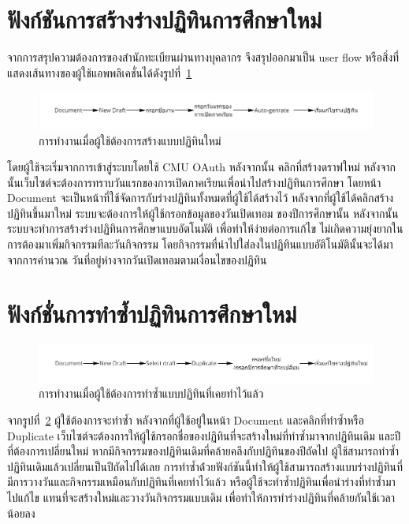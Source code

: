 \section{ฟังก์ชันการสร้างร่างปฏิทินการศึกษาใหม่}
จากการสรุปความต้องการของสำนักทะเบียนผ่านทางบุคลากร จึงสรุปออกมาเป็น user flow หรือสิ่งที่แสดงเส้นทางของผู้ใช้แอพพลิเคชั่นได้ดังรูปที่~\ref{fig:user-flow-new}

%
\begin{figure}[h]
\centering
\includegraphics[width=1\textwidth]{pic3.1.jpg}
\caption{การทำงานเมื่อผู้ใช้ต้องการสร้างแบบปฏิทินใหม่}
\label{fig:user-flow-new}
\end{figure}
%
โดยผู้ใช้จะเริ่มจากการเข้าสู่ระบบโดยใช้ CMU OAuth หลังจากนั้น คลิกที่สร้างดราฟใหม่ 
หลังจากนั้นเว็บไซต์จะต้องการทราบวันแรกของการเปิดภาคเรียนเพื่อนำไปสร้างปฏิทินการศึกษา
โดยหน้า Document จะเป็นหน้าที่ใช้จัดการกับร่างปฏิทินทั้งหมดที่ผู้ใช้ได้สร้างไว้
หลังจากที่ผู้ใช้ได้คลิกสร้างปฏิทินขึ้นมาใหม่ ระบบจะต้องการให้ผู้ใช้กรอกข้อมูลของวันเปิดเทอม
ของปีการศึกษานั้น หลังจากนั้นระบบจะทำการสร้างร่างปฏิทินการศึกษาแบบอัตโนมัติ
เพื่อทำให้ง่ายต่อการแก้ไข ไม่เกิดความยุ่งยากในการต้องมาเพิ่มกิจกรรมทีละวันกิจกรรม
โดยกิจกรรมที่นำไปใส่ลงในปฏิทินแบบอัติโนมัตินั้นจะได้มาจากการคำนวณ
วันที่อยู่ห่างจากวันเปิดเทอมตามเงื่อนไขของปฏิทิน

\section{ฟังก์ชั่นการทำซ้ำปฏิทินการศึกษาใหม่}
\begin{figure}[h]
\centering
\includegraphics[width=1\textwidth]{pic3.2.jpg}
\caption{การทำงานเมื่อผู้ใช้ต้องการทำซ้ำแบบปฏิทินที่เคยทำไว้แล้ว}
\label{fig:user-flow-duplicate}
\end{figure}
จากรูปที่~\ref{fig:user-flow-duplicate} ผู้ใช้ต้องการจะทำซ้ำ หลังจากที่ผู้ใช้อยู่ในหน้า Document และคลิกที่ทำซ้ำหรือ Duplicate
เว็บไซต์จะต้องการให้ผู้ใช้กรอกชื่อของปฏิทินที่จะสร้างใหม่ที่ทำซ้ำมาจากปฏิทินเดิม
และปีที่ต้องการเปลี่ยนใหม่ หากมีกิจกรรมของปฏิทินเดิมที่คล้ายคลึงกับปฏิทินของปีถัดไป 
ผู้ใช้สามารถทำซ้ำปฏิทินเดิมแล้วเปลี่ยนเป็นปีถัดไปได้เลย 
การทำซ้ำด่้วยฟังก์ชันนี้ทำให้ผู้ใช้สามารถสร้างแบบร่างปฏิทินที่มีการวางวันและกิจกรรมเหมือนกับปฏิทินที่เคยทำไว้แล้ว
หรือผู้ใช้จะทำซ้ำปฏิทินเพื่อนำร่างที่ทำซ้ำมาไปแก้ไข แทนที่จะสร้างใหม่และวางวันกิจกรรมแบบเดิม เพื่อทำให้การทำร่างปฏิทินที่คล้ายกันใช้เวลาน้อยลง

